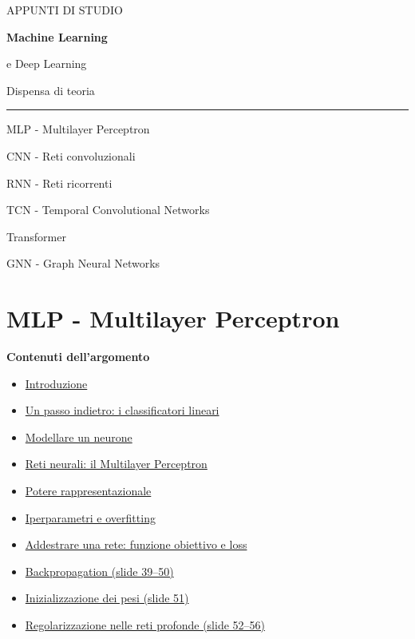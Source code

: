 \documentclass[11pt,a4paper,oneside,openany]{book}
\newenvironment{indiceargomento}{\begingroup\small\sffamily\color{grigio}\textbf{Contenuti dell'argomento}\par\begin{itemize}\setlength{\itemsep}{0pt}\setlength{\parskip}{0pt}}{\end{itemize}\endgroup\medskip}
\begin{document}
\frontmatter
\begin{titlepage}
\vspace*{30mm}
{\sffamily\small\color{grigio}APPUNTI DI STUDIO\par}
\vspace{10mm}
{\sffamily\Huge\bfseries\color{inchiostro}Machine Learning\par e Deep Learning\par}
\vspace{9mm}
{\sffamily\LARGE Dispensa di teoria\par}
\vspace{10mm}
{\color{inchiostro}\rule{\textwidth}{1pt}\par}
\vspace{6mm}
{\large MLP - Multilayer Perceptron\par CNN - Reti convoluzionali\par RNN - Reti ricorrenti\par TCN - Temporal Convolutional Networks\par Transformer\par GNN - Graph Neural Networks\par}
\vfill
\end{titlepage}
\tableofcontents
\mainmatter
\chapter{MLP - Multilayer Perceptron}\label{fonte01}

\begin{indiceargomento}
\item \hyperref[f01-r31]{Introduzione}
\item \hyperref[f01-r108]{Un passo indietro: i classificatori lineari}
\item \hyperref[f01-r267]{Modellare un neurone}
\item \hyperref[f01-r419]{Reti neurali: il Multilayer Perceptron}
\item \hyperref[f01-r487]{Potere rappresentazionale}
\item \hyperref[f01-r517]{Iperparametri e overfitting}
\item \hyperref[f01-r548]{Addestrare una rete: funzione obiettivo e loss}
\item \hyperref[f01-r727]{Backpropagation (slide 39--50)}
\item \hyperref[f01-r922]{Inizializzazione dei pesi (slide 51)}
\item \hyperref[f01-r969]{Regolarizzazione nelle reti profonde (slide 52--56)}
\end{indiceargomento}
\end{document}
